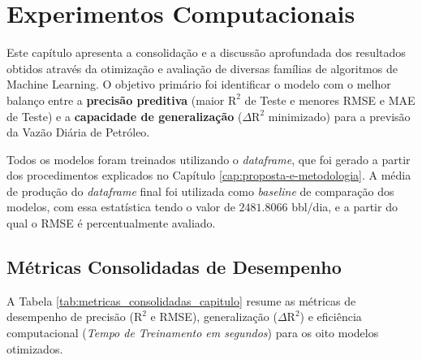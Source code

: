 \chapter{Experimentos Computacionais}
\label{cap:experimentos}

Este capítulo apresenta a consolidação e a discussão aprofundada dos resultados obtidos através da otimização e avaliação de diversas famílias de algoritmos de Machine Learning. O objetivo primário foi identificar o modelo com o melhor balanço entre a \textbf{precisão preditiva} (maior $\text{R}^2$ de Teste e menores \gls{RMSE} e \gls{MAE} de Teste) e a \textbf{capacidade de generalização} ($\Delta \text{R}^2$ minimizado) para a previsão da Vazão Diária de Petróleo.

Todos os modelos foram treinados utilizando o \textit{dataframe}, que foi gerado a partir dos procedimentos explicados no Capítulo \ref{cap:proposta-e-metodologia}. A média de produção do \textit{dataframe} final foi utilizada como \textit{baseline} de comparação dos modelos, com essa estatística tendo o valor de $\mathbf{2481.8066}$ bbl/dia, e a partir do qual o \gls{RMSE} é percentualmente avaliado.

\section{Métricas Consolidadas de Desempenho}
\label{sec:metricas}

A Tabela \ref{tab:metricas_consolidadas_capitulo} resume as métricas de desempenho de precisão ($\text{R}^2$ e RMSE), generalização ($\Delta \text{R}^2$) e eficiência computacional (\textit{Tempo de Treinamento em segundos}) para os oito modelos otimizados.

